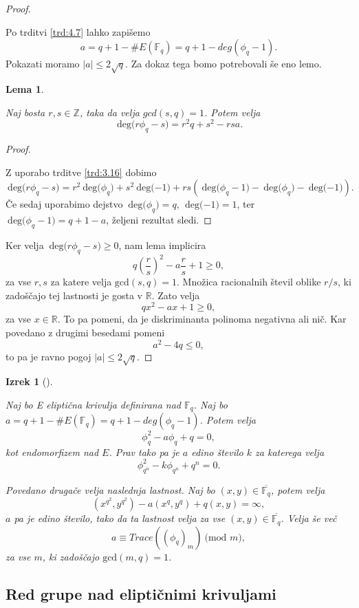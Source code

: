 \documentclass[12pt,a4paper,twoside]{article}
\theoremstyle{definition} %
\theoremstyle{plain} %
\newtheorem{lema}[definicija]{Lema}
\newtheorem{izrek}[definicija]{Izrek}
\numberwithin{equation}{section}  %
\newcommand{\R}{\mathbb R}
\newcommand{\Z}{\mathbb Z}
\newcommand{\F}{\mathbb F}
\newcommand{\E}[1]{E({#1})}
\newcommand{\MOD}[1]{\ \text{(mod }{#1}\text{)}}
\newcommand{\DEG}[1]{\ \text{deg(}{#1}\text{)}}
\begin{document}
\begin{proof}~

Po trditvi \ref{trd:4.7} lahko zapišemo
$$a=q+1-\#\E{\F_q} = q+1 -deg(\phi_q-1).$$
Pokazati moramo $|a| \leq 2\sqrt{q}.$
Za dokaz tega bomo potrebovali še eno lemo.
\begin{lema}~

Naj bosta $r,s \in \Z$, taka da velja $gcd(s,q)=1$. Potem velja
$$\DEG{r\phi_q-s} = r^2q+s^2-rsa.$$
\end{lema}

\begin{proof}~

Z uporabo trditve \ref{trd:3.16} dobimo
$$\DEG{r\phi_q-s} = r^2\DEG{\phi_q}+s^2\DEG{-1}+rs(\DEG{\phi_q-1}-\DEG{\phi_q}-\DEG{-1}).$$
Če sedaj uporabimo dejstvo $\DEG{\phi_q} = q,\ \DEG{-1} = 1$, ter $\DEG{\phi_q-1} = q+1-a$, željeni rezultat sledi.
\end{proof}

Ker velja $\DEG{r\phi_q-s} \geq 0$, nam lema implicira
$$q \left( \frac{r}{s} \right)^2-a\frac{r}{s}+1 \geq 0,$$
za vse $r,s$ za katere velja $\text{gcd}(s,q)=1$. Množica racionalnih števil oblike $r/s$, ki zadoščajo tej lastnosti je gosta v $\R$. Zato velja
$$qx^2-ax + 1 \geq 0,$$
za vse $x\in \R$. To pa pomeni, da je diskriminanta polinoma negativna ali nič. Kar povedano z drugimi besedami pomeni
$$a^2-4q \leq 0,$$
to pa je ravno pogoj $|a|\leq 2\sqrt{q}$.


\end{proof}


\begin{izrek}[]~

\label{izrek:4.10}

Naj bo E eliptična krivulja definirana nad $\F_q$. Naj bo $a = q+1-\#\E{\F_q} = q+1-deg(\phi_q-1)$. Potem velja
$$\phi^2_q-a\phi_q+q = 0,$$
kot endomorfizem nad $E$. Prav tako pa je $a$ edino število $k$ za katerega velja
$$\phi^2_{q^n}-k\phi_{q^n}+q^n = 0.$$

Povedano drugače velja naslednja lastnost. Naj bo $(x,y) \in  \overline{\F_q}$, potem velja
$$(x^{q^2},y^{q^2})-a(x^q,y^q)+q(x,y) = \infty,$$
$a$ pa je edino število, tako da ta lastnost velja za vse $(x,y) \in \overline{\F_q} $. Velja še več
$$a \equiv Trace((\phi_q)_m) \MOD{m},$$
za vse $m$, ki zadoščajo $\text{gcd}(m,q)=1$.

\end{izrek}

\subsection{Red grupe nad eliptičnimi krivuljami}
\end{document}
